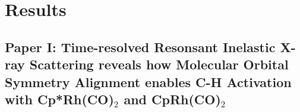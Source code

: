 \chapter{Results}

\section{Paper I: Time-resolved Resonsant Inelastic X-ray Scattering reveals how Molecular Orbital Symmetry Alignment enables C-H Activation with Cp*Rh(CO)$_{2}$ and CpRh(CO)$_{2}$}



